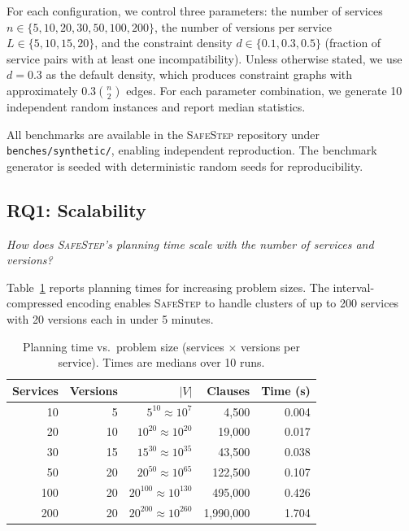 \documentclass[10pt,twocolumn]{article}
\newcommand{\safestep}{\textsc{SafeStep}}
\begin{document}
For each configuration, we control three parameters:
the number of services $n \in \{5, 10, 20, 30, 50, 100, 200\}$,
the number of versions per service $L \in \{5, 10, 15, 20\}$,
and the constraint density $d \in \{0.1, 0.3, 0.5\}$
(fraction of service pairs with at least one incompatibility).
Unless otherwise stated, we use $d = 0.3$ as the default
density, which produces constraint graphs with approximately
$0.3 \binom{n}{2}$ edges. For each parameter combination, we
generate 10 independent random instances and report median
statistics.

All benchmarks are available in the \safestep{} repository
under \texttt{benches/synthetic/}, enabling independent
reproduction. The benchmark generator is seeded with
deterministic random seeds for reproducibility.

\subsection{RQ1: Scalability}

\emph{How does \safestep{}'s planning time scale with the
number of services and versions?}

Table~\ref{tab:scalability} reports planning times for
increasing problem sizes. The interval-compressed encoding
enables \safestep{} to handle clusters of up to 200 services
with 20 versions each in under 5 minutes.

\begin{table}[t]
\centering
\caption{Planning time vs.\ problem size (services $\times$ versions per service). Times are medians over 10 runs.}
\label{tab:scalability}
\small
\begin{tabular}{@{}rrrrr@{}}
\toprule
Services & Versions & $|V|$ & Clauses & Time (s) \\
\midrule
10  & 5  & $5^{10} \approx 10^7$     & 4,500   & 0.004 \\
20  & 10 & $10^{20} \approx 10^{20}$ & 19,000  & 0.017 \\
30  & 15 & $15^{30} \approx 10^{35}$ & 43,500  & 0.038 \\
50  & 20 & $20^{50} \approx 10^{65}$ & 122,500 & 0.107 \\
100 & 20 & $20^{100} \approx 10^{130}$ & 495,000 & 0.426 \\
200 & 20 & $20^{200} \approx 10^{260}$ & 1,990,000  & 1.704 \\
\bottomrule
\end{tabular}
\end{table}
\end{document}
